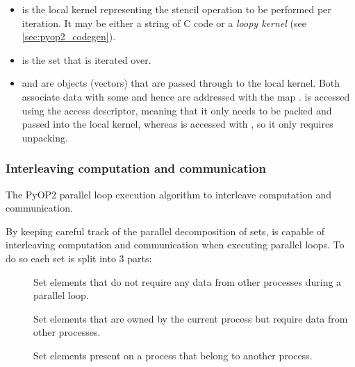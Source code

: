 \documentclass[thesis]{subfiles}
\begin{document}
\begin{itemize}
  \item
     is the local kernel representing the stencil operation to be performed per iteration.
    It may be either a string of C code or a \textit{loopy kernel} (see \cref{sec:pyop2_codegen}).
  \item
     is the set that is iterated over.
  \item
     and  are  objects (vectors) that are passed through to the local kernel.
    Both associate data with some  and hence are addressed with the map .
     is accessed using the  access descriptor, meaning that it only needs to be packed and passed into the local kernel, whereas  is accessed with , so it only requires unpacking.
\end{itemize}

\subsubsection{Interleaving computation and communication}

\begin{algorithm}
  \caption{The PyOP2 parallel loop execution algorithm to interleave computation and communication.}
  \begin{algorithmic}[1]
    \State {} 

     
      \State {}
    \EndFor

    \State {} 

     
      \State {}
    \EndFor
  \end{algorithmic}
  \label{alg:pyop2_comp_comm_overlap}
\end{algorithm}

By keeping careful track of the parallel decomposition of sets,  is capable of interleaving computation and communication when executing parallel loops.
To do so each set is split into 3 parts:

\begin{description}
  \item[\coreiter]
    Set elements that do not require any data from other processes during a parallel loop.

  \item[\ownediter]
    Set elements that are owned by the current process but require data from other processes.

  \item[\ghostiter]
    Set elements present on a process that belong to another process.
\end{description}
\end{document}
